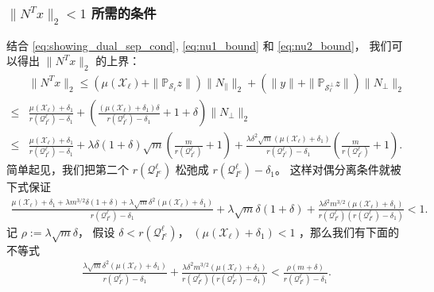 \documentclass[main.tex]{subfiles}
\begin{document}
\subsubsection{ $\|N^T x\|_2<1$ 所需的条件}
结合 \eqref{eq:showing_dual_sep_cond}, \eqref{eq:nu1_bound} 和 \eqref{eq:nu2_bound}， 
我们可以得出 $\|N^T x\|_2$ 的上界：
\begin{align*}
  &\|N^T x\|_2 \leq (\mu(\mathcal{X}_{\ell})+\|\mathbb{P}_{\mathcal{S}_{\ell}}z\|) 
  \|N_{\parallel}\|_2+(\|y\|+\|\mathbb{P}_{\mathcal{S}_{\ell}^{\perp}}z\|)\|N_{\perp}\|_2\\
  \leq&\frac{\mu(\mathcal{X}_{\ell})+\delta_1}{r{\left( \mathcal{Q}_{I^c}^{\ell}\right)}-\delta_1}
  +\left(\frac{(\mu(\mathcal{X}_{\ell})+\delta_1)\delta}{r{\left( \mathcal{Q}_{I^c}^{\ell}\right)}-\delta_1}+1+\delta\right)
  \|N_{\perp}\|_2\\
  \leq& \frac{\mu(\mathcal{X}_{\ell})+\delta_1}{r{\left( \mathcal{Q}_{I^c}^{\ell}\right)}-\delta_1} +
  \lambda\delta(1+\delta)\sqrt{m} \left(\frac{m}{r(\mathcal{Q}_{I^c}^{\ell})}+1\right)
  + \frac{\lambda\delta^2\sqrt{m}(\mu(\mathcal{X}_{\ell})+\delta_1)}
  {r{\left( \mathcal{Q}_{I^c}^{\ell}\right)}-\delta_1}\left(\frac{m}{r(\mathcal{Q}_{I^c}^{\ell})}+1\right).
\end{align*}
简单起见，我们把第二个 $r(\mathcal{Q}_{I^c}^{\ell})$ 松弛成 $r(\mathcal{Q}_{I^c}^{\ell})-\delta_1$。
这样对偶分离条件就被下式保证
\begin{align*}
  \frac{\mu(\mathcal{X}_{\ell})+\delta_1 +\lambda m^{3/2}\delta(1+\delta)+
  \lambda\sqrt{m}\delta^2(\mu(\mathcal{X}_{\ell})+\delta_1)}
  {r{\left( \mathcal{Q}_{I^c}^{\ell}\right)}-\delta_1}
  + \lambda\sqrt{m}\delta(1+\delta)+\frac{\lambda\delta^2 m^{3/2}(\mu(\mathcal{X}_{\ell})+\delta_1)}
  {r{\left( \mathcal{Q}_{I^c}^{\ell}\right)}(r{\left( \mathcal{Q}_{I^c}^{\ell}\right)}-\delta_1)}  < 1.
\end{align*}
记 $\rho:=\lambda\sqrt{m}\delta$， 假设 $\delta<r{\left( \mathcal{Q}_{I^c}^{\ell}\right)}$，
$(\mu(\mathcal{X}_{\ell})+\delta_1)<1$ ，那么我们有下面的不等式
\begin{align*}
  \frac{\lambda\sqrt{m}\delta^2(\mu(\mathcal{X}_{\ell})+\delta_1)}
  {r{\left( \mathcal{Q}_{I^c}^{\ell}\right)}-\delta_1}
  +\frac{\lambda\delta^2 m^{3/2}(\mu(\mathcal{X}_{\ell})+\delta_1)}
  {r{\left( \mathcal{Q}_{I^c}^{\ell}\right)}(r{\left( \mathcal{Q}_{I^c}^{\ell}\right)}-\delta_1)}
  < \frac{\rho (m+\delta)}{r{\left( \mathcal{Q}_{I^c}^{\ell}\right)}-\delta_1}.
\end{align*}
\end{document}
